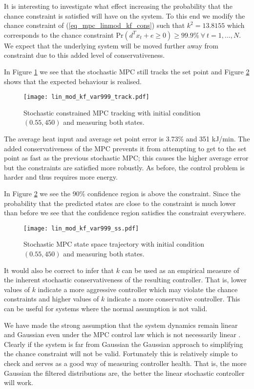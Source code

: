 It is interesting to investigate what effect increasing the probability that the chance constraint is satisfied will have on the system. To this end we modify the chance constraint of (\ref{eq_mpc_linmod_kf_cons}) such that $k^2 = 13.8155$ which corresponds to the chance constraint $\text{Pr}(d^Tx_t + e \geq 0) \geq 99.9\% ~\forall ~t=1,...,N$. We expect that the underlying system will be moved further away from constraint due to this added level of conservativeness.

In Figure \ref{fig_lin_mod_kf_var999_track} we see that the stochastic MPC still tracks the set point and Figure \ref{fig_lin_mod_kf_var999_ss} shows that the expected behaviour is realised. 
\begin{figure}[H] 
\centering
\texttt{[image: lin\_mod\_kf\_var999\_track.pdf]}
\caption{Stochastic constrained MPC tracking with initial condition $(0.55, 450)$ and measuring both states.}
\label{fig_lin_mod_kf_var999_track}
\end{figure}
The average heat input and average set point error is 3.73\% and 351 kJ/min. The added conservativeness of the MPC prevents it from attempting to get to the set point as fast as the previous stochastic MPC; this causes the higher average error but the constraints are satisfied more robustly. As before, the control problem is harder and thus requires more energy.

In Figure \ref{fig_lin_mod_kf_var999_ss} we see the 90\% confidence region is above the constraint. Since the probability that the predicted states are close to the constraint is much lower than before we see that the confidence region satisfies the constraint everywhere.
\begin{figure}[H] 
\centering
\texttt{[image: lin\_mod\_kf\_var999\_ss.pdf]}
\caption{Stochastic MPC state space trajectory with initial condition $(0.55, 450)$ and measuring both states.}
\label{fig_lin_mod_kf_var999_ss}
\end{figure}
It would also be correct to infer that $k$ can be used as an empirical measure of the inherent stochastic conservativeness of the resulting controller. That is, lower values of $k$ indicate a more aggressive controller which may violate the chance constraints and higher values of $k$ indicate a more conservative controller. This can be useful for systems where the normal assumption is not valid. 

We have made the strong assumption that the system dynamics remain linear and Gaussian even under the MPC control law which is not necessarily linear \cite{mac}. Clearly if the system is far from Gaussian the Gaussian approach to simplifying the chance constraint will not be valid. Fortunately this is relatively simple to check and serves as a good way of measuring controller health. That is, the more Gaussian the filtered distributions are, the better the linear stochastic controller will work. 

